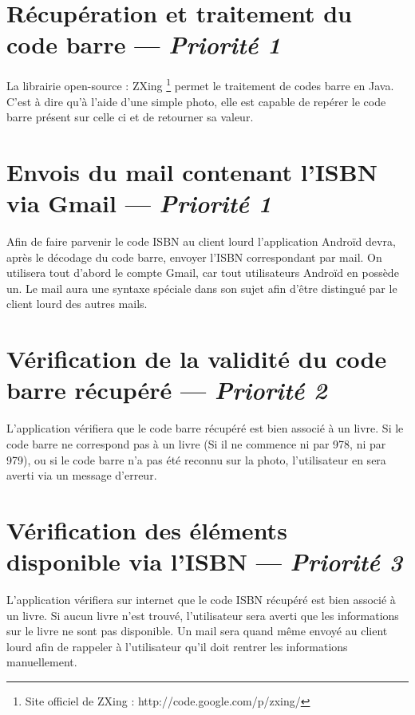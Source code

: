 \section[Récupération et traitement du code barre]{Récupération et traitement du code barre — \emph{Priorité 1}}
La librairie open-source : ZXing \footnote{Site officiel de ZXing : http://code.google.com/p/zxing/} 
permet le traitement de codes barre en Java. 
C'est à dire qu'à l'aide d'une simple photo, elle est capable de repérer le code barre présent sur celle ci et de retourner sa valeur.

\section[Envois du mail contenant l'ISBN via Gmail]{Envois du mail contenant l'ISBN via Gmail — \emph{Priorité 1}}
Afin de faire parvenir le code ISBN au client lourd l'application Androïd devra, après le décodage du code barre, envoyer l'ISBN correspondant par mail. 
On utilisera tout d'abord le compte Gmail, car tout utilisateurs Androïd en possède un. 
Le mail aura une syntaxe spéciale dans son sujet afin d'être distingué par le client lourd des autres mails.


\section[Vérification de la validité du code barre récupéré]{Vérification de la validité du code barre récupéré — \emph{Priorité 2}}
L'application vérifiera que le code barre récupéré est bien associé à un livre. 
Si le code barre ne correspond pas à un livre (Si il ne commence ni par 978, ni par 979), ou si le code barre n'a pas été reconnu sur la photo, l'utilisateur en sera averti via un message d'erreur.


\section[Vérification des éléments disponible via l'ISBN]{Vérification des éléments disponible via l'ISBN — \emph{Priorité 3}}
L'application vérifiera sur internet que le code ISBN récupéré est bien associé à un livre.
Si aucun livre n'est trouvé, l'utilisateur sera averti que les informations sur le livre ne sont pas disponible. 
Un mail sera quand même envoyé au client lourd afin de rappeler à l'utilisateur qu'il doit rentrer les informations manuellement.
 
